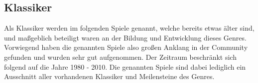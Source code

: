 \subsection{Klassiker}
Als Klassiker werden im folgenden Spiele genannt, welche bereits etwas älter sind, und maßgeblich beteiligt waren an der Bildung und Entwicklung dieses Genres. Vorwiegend haben die genannten Spiele also großen Anklang in der Community gefunden und wurden sehr gut aufgenommen. Der Zeitraum beschränkt sich folgend auf die Jahre 1980 - 2010. Die genannten Spiele sind dabei lediglich ein Ausschnitt aller vorhandenen Klassiker und Meilensteine des Genres. 



